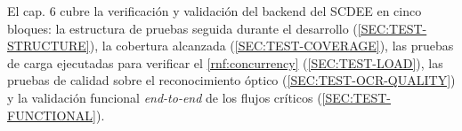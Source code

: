 El cap. 6 cubre la verificación y validación del backend del SCDEE en
cinco bloques: la estructura de pruebas seguida durante el desarrollo
(\cref{SEC:TEST-STRUCTURE}), la cobertura alcanzada
(\cref{SEC:TEST-COVERAGE}), las pruebas de carga ejecutadas para
verificar el \cref{rnf:concurrency} (\cref{SEC:TEST-LOAD}), las pruebas
de calidad sobre el reconocimiento óptico
(\cref{SEC:TEST-OCR-QUALITY}) y la validación funcional \textit{end-to-end}
de los flujos críticos (\cref{SEC:TEST-FUNCTIONAL}).
